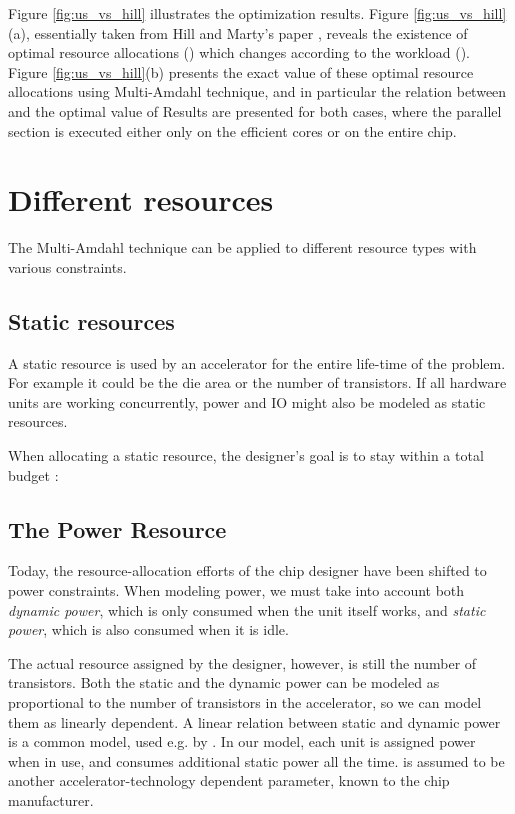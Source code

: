 \documentclass[twocolumn,english]{IEEEtran}
\begin{document}
Figure \ref{fig:us_vs_hill} illustrates the optimization results.
Figure \ref{fig:us_vs_hill}(a), essentially taken from Hill and Marty's
paper \cite{hill2008amdahl}, reveals the existence of optimal resource
allocations () which changes according to the workload
(). Figure \ref{fig:us_vs_hill}(b) presents the exact
value of these optimal resource allocations using Multi-Amdahl technique,
and in particular the relation between  and the optimal
value of  Results are presented for both cases, where
the parallel section is executed either only on the efficient cores
or on the entire chip.


\section{\label{sec:Resource}Different resources}

The Multi-Amdahl technique can be applied to different resource types
with various constraints.


\subsection{\label{sub:resource-static}Static resources}

A static resource is used by an accelerator for the entire life-time
of the problem. For example it could be the die area or the number
of transistors. If all hardware units are working concurrently, power
and IO might also be modeled as static resources.

When allocating a static resource, the designer's goal is to stay
within a total budget :





\subsection{The Power Resource}

Today, the resource-allocation efforts of the chip designer have been
shifted to power constraints. When modeling power, we must take into
account both \textit{dynamic power}, which is only consumed when the
unit itself works, and \textit{static power}, which is also consumed
when it is idle.

The actual resource assigned by the designer, however, is still the
number of transistors. Both the static and the dynamic power can be
modeled as proportional to the number of transistors in the accelerator,
so we can model them as linearly dependent. A linear relation between
static and dynamic power is a common model, used e.g. by \cite{ExtendingAmda}.
In our model, each unit is assigned  power when in use, and
consumes additional  static power all the time. 
is assumed to be another accelerator-technology dependent parameter,
known to the chip manufacturer.
\end{document}
